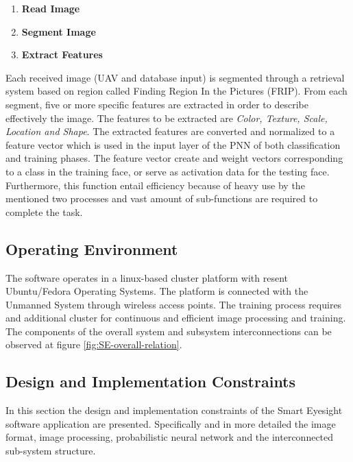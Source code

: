 \documentclass[12pt]{article}
\begin{document}
\begin{enumerate}
\item \textbf{Read Image}
\item \textbf{Segment Image}
\item \textbf{Extract Features}
\end{enumerate}

Each received image (UAV and database input) is segmented through a
retrieval system based on region called Finding Region In the Pictures
(FRIP). From each segment, five or more specific features are
extracted in order to describe effectively the image. The features to
be extracted are \textit{Color, Texture, Scale, Location and Shape}.
The extracted features are converted and normalized to a feature
vector which is used in the input layer of the PNN of both
classification and training phases. The feature vector create and
weight vectors corresponding to a class in the training face, or serve
as activation data for the testing face. Furthermore, this function
entail efficiency because of heavy use by the mentioned two processes
and vast amount of sub-functions are required to complete the task.



\subsection{Operating Environment}
The software operates in a linux-based cluster platform with resent
Ubuntu/Fedora Operating Systems. The platform is connected with the
Unmanned System through wireless access points. The training process
requires and additional cluster for continuous and efficient image
processing and training. The components of the overall system and
subsystem interconnections can be observed at figure
\ref{fig:SE-overall-relation}.

\subsection{Design and Implementation Constraints}
In this section the design and implementation constraints of the Smart
Eyesight software application are presented. Specifically and in more
detailed the image format, image processing, probabilistic neural
network and the interconnected sub-system structure.
\end{document}
